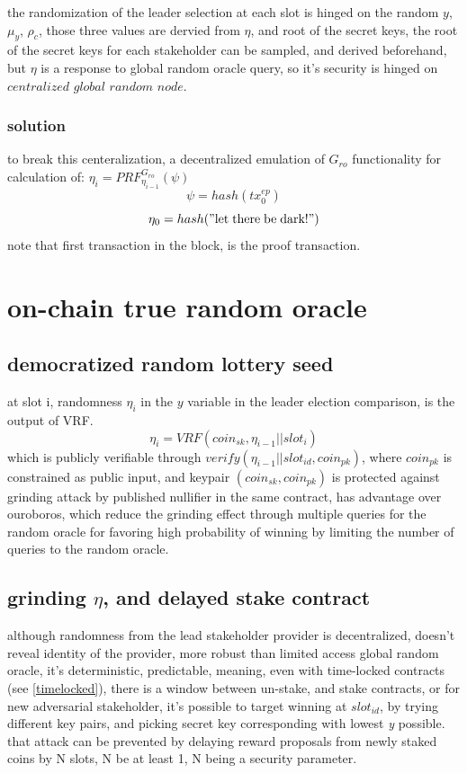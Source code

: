 \documentclass{article}
\begin{document}
the randomization of the leader selection at each slot is hinged on the random $y$, $\mu_y$, $\rho_c$, those three values are dervied from $\eta$, and root of the secret keys, the root of the secret keys for each stakeholder can be sampled, and derived beforehand, but $\eta$ is a response to global random oracle query, so it's security is hinged on $\textit{centralized global random node}$.

\subsubsection{ solution}

to break this centeralization, a decentralized emulation of $G_{ro}$ functionality for calculation of: $\eta_i=PRF^{G_{ro}}_{\eta_{i-1}}(\psi)$
$$\psi   =  hash(tx^{ep}_{0})$$
$$\eta_0 =  hash(\mathrm{"let\; there\; be\; dark!"})$$
note that first transaction in the block, is the proof transaction.


\section {on-chain true random oracle}

\subsection{democratized random lottery seed}
at slot i, randomness $\eta_i$ in the $y$ variable in the leader election comparison, is the output of VRF.
$$\eta_i=VRF(coin_{sk}, \eta_{i-1}||slot_{i})$$  which is publicly verifiable through $verify(\eta_{i-1}||slot_{id}, coin_{pk})$, where $coin_{pk}$ is constrained as public input, and keypair $(coin_{sk},coin_{pk})$ is protected against grinding attack by published nullifier in the same contract, has advantage over ouroboros, which reduce the grinding effect through multiple queries for the random oracle for favoring high probability of winning by limiting the number of queries to the random oracle.  \cite{ouroboros_genesis}

\subsection {grinding $\eta$, and delayed stake contract}
although randomness from the lead stakeholder provider is decentralized, doesn't reveal identity of the provider, more robust than limited access global random oracle, it's deterministic, predictable, meaning, even with time-locked contracts (see \ref{timelocked}), there is a window between un-stake, and stake contracts, or for new adversarial stakeholder, it's possible to target winning at $slot_{id}$, by trying different key pairs, and picking secret key corresponding with lowest \emph{y} possible.
that attack can be prevented by delaying reward proposals from newly staked coins by N slots, N be at least 1, N being a security parameter.
\end{document}
